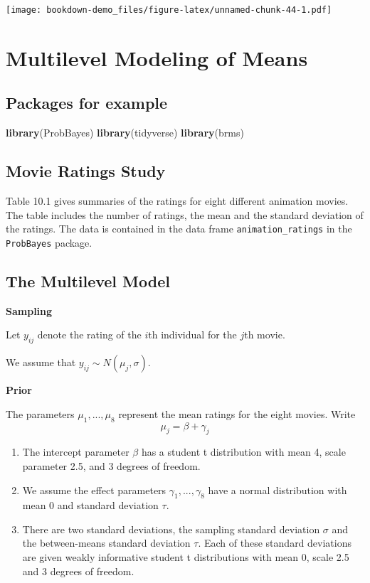 \documentclass[
]{book}
\newenvironment{Shaded}{\begin{snugshade}}{\end{snugshade}}
\newcommand{\KeywordTok}[1]{\textcolor[rgb]{0.13,0.29,0.53}{\textbf{#1}}}
\newcommand{\NormalTok}[1]{#1}
\begin{document}
\texttt{[image: bookdown-demo\_files/figure-latex/unnamed-chunk-44-1.pdf]}

\hypertarget{multilevel-modeling-of-means}{%
\chapter{Multilevel Modeling of Means}\label{multilevel-modeling-of-means}}

\hypertarget{packages-for-example}{%
\section{Packages for example}\label{packages-for-example}}

\begin{Shaded}
\begin{Highlighting}[]
\KeywordTok{library}\NormalTok{(ProbBayes)}
\KeywordTok{library}\NormalTok{(tidyverse)}
\KeywordTok{library}\NormalTok{(brms)}
\end{Highlighting}
\end{Shaded}

\hypertarget{movie-ratings-study}{%
\section{Movie Ratings Study}\label{movie-ratings-study}}

Table 10.1 gives summaries of the ratings for eight different animation movies. The table includes the number of ratings, the mean and the standard deviation of the ratings. The data is contained in the data frame \texttt{animation\_ratings} in the \texttt{ProbBayes} package.

\hypertarget{the-multilevel-model}{%
\section{The Multilevel Model}\label{the-multilevel-model}}

\textbf{Sampling}

Let \(y_{ij}\) denote the rating of the \(i\)th individual for the \(j\)th movie.

We assume that \(y_{ij} \sim N(\mu_j, \sigma)\).

\textbf{Prior}

The parameters \(\mu_1, ..., \mu_8\) represent the mean ratings for the eight movies. Write
\[
\mu_j = \beta + \gamma_j
\]

\begin{enumerate}
\def\labelenumi{\arabic{enumi}.}
\item
  The intercept parameter \(\beta\) has a student t distribution with mean 4, scale parameter 2.5, and 3 degrees of freedom.
\item
  We assume the effect parameters \(\gamma_1, ..., \gamma_8\) have a normal distribution with mean 0 and standard deviation \(\tau\).
\item
  There are two standard deviations, the sampling standard deviation \(\sigma\) and the between-means standard deviation \(\tau\). Each of these standard deviations are given weakly informative student t distributions with mean 0, scale 2.5 and 3 degrees of freedom.
\end{enumerate}
\end{document}
